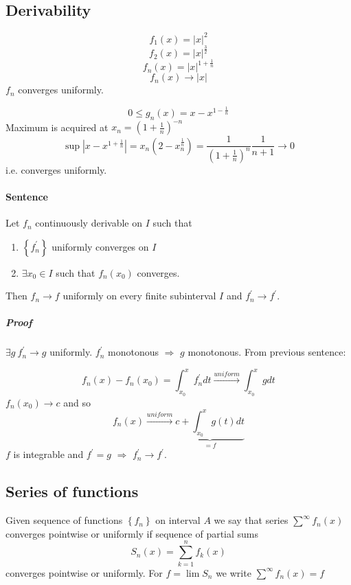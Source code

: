 \subsection{Derivability}
$$f_1(x) = |x|^2$$
$$f_2(x) = |x|^{\frac{3}{2}}$$
$$f_n(x) = |x|^{1+\frac{1}{n}}$$
$$f_n(x) \to |x|$$
$f_n$ converges uniformly.

$$0 \leq g_n(x) = x - x^{1-\frac{1}{n}}$$
Maximum is acquired at $x_n = \left( 1+\frac{1}{n} \right)^{-n}$
$$\sup|x - x^{1+\frac{1}{n}}| = x_n \left( 2-x_n^{\frac{1}{n}} \right) = \frac{1}{\left(1+\frac{1}{n}\right)^n}\frac{1}{n+1} \to 0$$
i.e. converges uniformly.
\paragraph{Sentence}
Let $f_n$ continuously derivable on $I$ such that
\begin{enumerate}
	\item $\left\{ f^\prime_n\right\}$ uniformly converges on $I$
	\item $\exists x_0 \in I$ such that $f_n(x_0)$ converges.
\end{enumerate}
Then $f_n \to f$ uniformly on every finite subinterval $I$ and $f_n^\prime \to f^\prime$.
\subparagraph{Proof}
$\exists g \: f^\prime_n \to g$ uniformly. $f^\prime_n$ monotonous $\Rightarrow$ $g$ monotonous.
From previous sentence:

$$f_n(x) - f_n(x_0) = \int_{x_0}^{x} f^\prime_n dt \stackrel{uniform}{\to} \int_{x_0}^x g dt$$
$f_n(x_0) \to c$ and so
$$f_n(x) \stackrel{uniform}{\to} \underbrace{c + \int_{x_0}^x g(t) dt}_{=f}$$
$f$ is integrable and $f^\prime = g$ $\Rightarrow$ $f_n^\prime \to f^\prime$.
\subsection{Series of functions}
Given sequence of functions $\left\{f_n\right\}$ on interval $A$ we say that series $\sum^\infty f_n(x)$ converges pointwise or uniformly if sequence of partial sums
$$S_n(x) = \sum_{k=1}^n f_k(x)$$
converges pointwise or uniformly. For $f = \lim S_n$ we write $\sum^\infty f_n(x)=f$  
